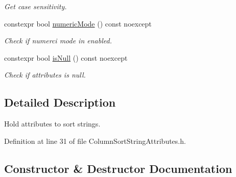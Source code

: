 \begin{DoxyCompactItemize}
\begin{DoxyCompactList}\small\item\em Get case sensitivity. \end{DoxyCompactList}\item 
constexpr bool \hyperlink{class_mdt_1_1_item_model_1_1_column_sort_string_attributes_a64b161abc0c58dd14a8721e41dea34d6}{numeric\+Mode} () const noexcept\hypertarget{class_mdt_1_1_item_model_1_1_column_sort_string_attributes_a64b161abc0c58dd14a8721e41dea34d6}{}\label{class_mdt_1_1_item_model_1_1_column_sort_string_attributes_a64b161abc0c58dd14a8721e41dea34d6}

\begin{DoxyCompactList}\small\item\em Check if numerci mode in enabled. \end{DoxyCompactList}\item 
constexpr bool \hyperlink{class_mdt_1_1_item_model_1_1_column_sort_string_attributes_a906e9936495f43a96f08d9244d43604f}{is\+Null} () const noexcept\hypertarget{class_mdt_1_1_item_model_1_1_column_sort_string_attributes_a906e9936495f43a96f08d9244d43604f}{}\label{class_mdt_1_1_item_model_1_1_column_sort_string_attributes_a906e9936495f43a96f08d9244d43604f}

\begin{DoxyCompactList}\small\item\em Check if attributes is null. \end{DoxyCompactList}\end{DoxyCompactItemize}


\subsection{Detailed Description}
Hold attributes to sort strings. 

Definition at line 31 of file Column\+Sort\+String\+Attributes.\+h.



\subsection{Constructor \& Destructor Documentation}
